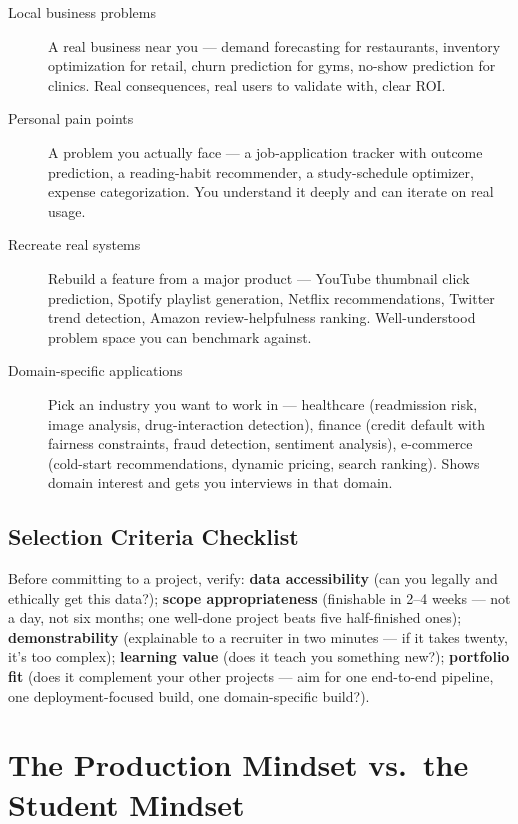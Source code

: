 \begin{description}
  \item[Local business problems] A real business near you --- demand forecasting for restaurants, inventory
  optimization for retail, churn prediction for gyms, no-show prediction for clinics. Real consequences, real
  users to validate with, clear ROI.
  \item[Personal pain points] A problem you actually face --- a job-application tracker with outcome prediction,
  a reading-habit recommender, a study-schedule optimizer, expense categorization. You understand it deeply and
  can iterate on real usage.
  \item[Recreate real systems] Rebuild a feature from a major product --- YouTube thumbnail click prediction,
  Spotify playlist generation, Netflix recommendations, Twitter trend detection, Amazon review-helpfulness
  ranking. Well-understood problem space you can benchmark against.
  \item[Domain-specific applications] Pick an industry you want to work in --- healthcare (readmission risk,
  image analysis, drug-interaction detection), finance (credit default with fairness constraints, fraud
  detection, sentiment analysis), e-commerce (cold-start recommendations, dynamic pricing, search ranking). Shows
  domain interest and gets you interviews in that domain.
\end{description}

\subsection{Selection Criteria Checklist}

Before committing to a project, verify: \textbf{data accessibility} (can you legally and ethically get this
data?); \textbf{scope appropriateness} (finishable in 2--4 weeks --- not a day, not six months; one well-done
project beats five half-finished ones); \textbf{demonstrability} (explainable to a recruiter in two minutes --- if
it takes twenty, it's too complex); \textbf{learning value} (does it teach you something new?); \textbf{portfolio
fit} (does it complement your other projects --- aim for one end-to-end pipeline, one deployment-focused build,
one domain-specific build?).

\section{The Production Mindset vs.\ the Student Mindset}

